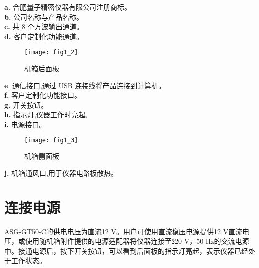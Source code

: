 \noindent \textbf{a.} 合肥量子精密仪器有限公司注册商标。\\
\textbf{b.} 公司名称与产品名称。\\
\textbf{c.} 共 8 个方波输出通道。\\
\textbf{d.} 客户定制化功能通道。

\begin{figure}[ht]
\centering
\texttt{[image: fig1\_2]}
\caption{机箱后面板}\label{fig:fig1_2}
\end{figure}

\noindent \textbf{e}. 通信接口,通过 USB 连接线将产品连接到计算机。\\
\textbf{f.} 客户定制化功能接口。\\
\textbf{g.} 开关按钮。\\
\textbf{h.} 指示灯,仪器工作时亮起。\\
\textbf{i.} 电源接口。

\begin{figure}[ht]
\centering
\texttt{[image: fig1\_3]}
\caption{机箱侧面板}\label{fig:fig1_3}
\end{figure}
\noindent \textbf{j.} 机箱通风口,用于仪器电路板散热。

\section{\heiti 连接电源}
ASG-GT50-C的供电电压为直流12 V。用户可使用直流稳压电源提供12 V直流电压，或使用随机箱附件提供的电源适配器将仪器连接至220 V，50 Hz的交流电源中。接通电源后，按下开关按钮，可以看到后面板的指示灯亮起，表示仪器已经处于工作状态。

